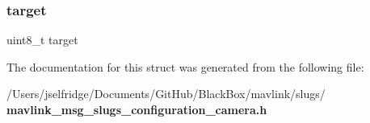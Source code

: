\mbox{\label{struct____mavlink__slugs__configuration__camera__t_a5f333beb3be5b82c1e091308136aeb7d}} 
\subsubsection{target}
{\footnotesize\ttfamily uint8\+\_\+t target}



The documentation for this struct was generated from the following file\+:\begin{DoxyCompactItemize}
\item 
/\+Users/jselfridge/\+Documents/\+Git\+Hub/\+Black\+Box/mavlink/slugs/\textbf{ mavlink\+\_\+msg\+\_\+slugs\+\_\+configuration\+\_\+camera.\+h}\end{DoxyCompactItemize}
